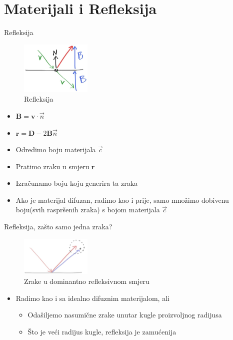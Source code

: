 \documentclass[9pt]{beamer}
\begin{document}
\section{Materijali i Refleksija}
\begin{frame}{Refleksija}
\begin{figure}
	\includegraphics[width=0.3\textwidth]{./slike/ray-reflect.png}
	\caption{Refleksija}
\end{figure}
\begin{itemize}
	\item $\mathbf{B} = \mathbf{v}\cdot\vec{n}$
	\item $\mathbf{r} = \mathbf{D} - 2\mathbf{B}\vec{n} $
	\item Odredimo boju materijala $\vec{c}$
	\item Pratimo zraku u smjeru $\mathbf{r}$
	\item Izračunamo boju koju generira ta zraka	
	\item Ako je materijal difuzan, radimo kao i prije, samo množimo dobivenu boju(svih raspršenih zraka) s bojom materijala $\vec{c}$
\end{itemize}
\end{frame}
\begin{frame}{Refleksija, zašto samo jedna zraka?}
\begin{figure}
	\includegraphics[width=0.3\textwidth]{./slike/reflect-fuzzy.png}
	\caption{Zrake u dominantno refleksivnom smjeru}
\end{figure}
\begin{itemize}
	\item Radimo kao i sa idealno difuznim materijalom, ali
	\begin{itemize}
		\item Odašiljemo nasumične zrake unutar kugle proizvoljnog radijusa
		\item Što je veći radijus kugle, refleksija je zamućenija
	\end{itemize}
\end{itemize}
\end{frame}
\end{document}
